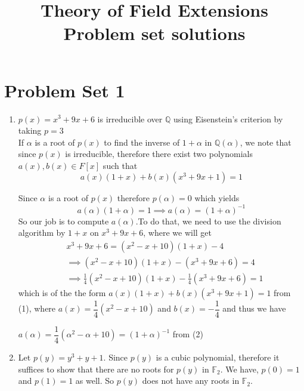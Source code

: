 \documentclass[12pt]{article}
\title{Theory of Field Extensions Problem set solutions}
\begin{document}
\maketitle
\section{Problem Set 1}
\begin{enumerate}
    \item[\bf{Soln 1:}] $p(x)=x^3 +9x+6$  is irreducible over $\mathbb{Q}$ using Eisenstein's criterion by taking $p=3$ \\
    If $\alpha$ is a root of $p(x)$ to find the inverse of $1+\alpha$ in $\mathbb{Q}(\alpha)$, we note that since $p(x)$ is irreducible, therefore there exist two polynomials $a(x),b(x)  \in F[x]$ such that
\begin{equation}
    a(x)(1+x) + b(x)(x^3+9x+1)=1
\end{equation}


 Since $\alpha$ is a root of $p(x)$ therefore $p(\alpha)=0$ which yields 
 \begin{equation}
    a(\alpha)(1+\alpha)=1 \implies a(\alpha)=(1+\alpha)^{-1}
\end{equation}
So our job is to compute $a(\alpha)$.To do that, we need to use the division algorithm by $1+x$ on $x^3 +9x+6$, where we will get 
\begin{align*}
    &   x^3 +9x+6=(x^2-x+10)(1+x)-4 \\
    &\implies (x^2-x+10)(1+x)-(x^3 +9x+6)=4 \\
    &\implies \frac{1}{4}(x^2-x+10)(1+x)-\frac{1}{4}(x^3 +9x+6)=1
\end{align*}
    which is of the the form $a(x)(1+x) + b(x)(x^3+9x+1)=1$ from (1), where $a(x)=\dfrac{1}{4}(x^2-x+10)$ and $b(x)=-\dfrac{1}{4}$ and thus we have
    
    
    $a(\alpha)=\dfrac{1}{4}(\alpha^2-\alpha +10)=(1+\alpha)^{-1}$ from (2)

    \item[\bf{Soln 2}: ] Let $p(y)=y^3+y+1$. Since $p(y)$ is a cubic polynomial, therefore it suffices to show that there are no roots for $p(y)$ in $\mathbb{F}_2$. We have, $p(0)=1$ and $p(1)=1$ as well. So $p(y)$ does not have any roots in $\mathbb{F}_2$.


\end{enumerate}
\end{document}
